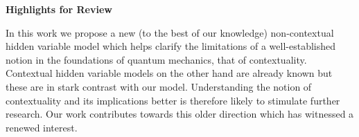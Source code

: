 \documentclass[12pt]{article}
\begin{document}
\thispagestyle{empty}
\centerline{\large \bf Highlights for Review}
\vspace*12pt
In this work we propose a new (to the best of our knowledge)
non-contextual hidden variable model which helps clarify the
limitations of a well-established notion in the foundations
of quantum mechanics, that of contextuality. Contextual
hidden variable models on the other hand are already known
but these are in stark contrast with our model.
Understanding the notion of contextuality and its
implications better is therefore likely to stimulate further
research. Our work contributes towards this older direction
which has witnessed a renewed interest.
\end{document}
